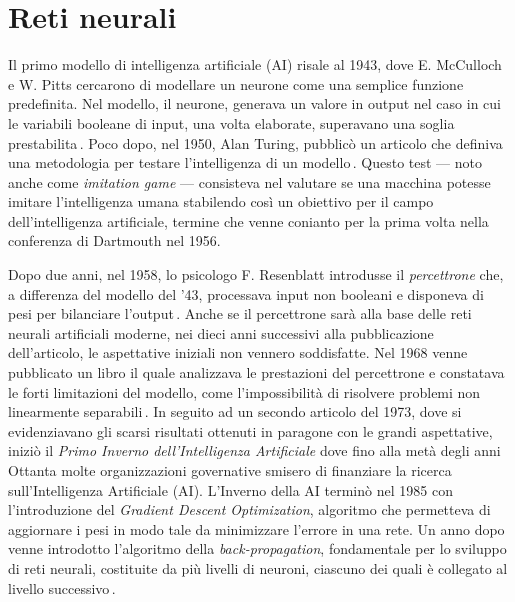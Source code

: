 
\chapter{Reti neurali}\label{chp:neural-networks}
% 
Il primo modello di intelligenza artificiale (\acs{AI}) risale al 1943, dove E. McCulloch e W. Pitts cercarono di modellare un neurone come una semplice funzione predefinita. Nel modello, il neurone, generava un valore in output nel caso in cui le variabili booleane di input, una volta elaborate, superavano una soglia prestabilita\,\cite[``A logical calculus of the ideas immanent in nervous activity'']{mcculloch1943logical}. Poco dopo, nel 1950, Alan Turing, pubblicò un articolo che definiva una metodologia per testare l'intelligenza di un modello\,\cite[``Computing machinery and intelligence'']{turing2009computing}. Questo test — noto anche come \textit{imitation game} — consisteva nel valutare se una macchina potesse imitare l'intelligenza umana stabilendo così un obiettivo per il campo dell'intelligenza artificiale, termine che venne conianto per la prima volta nella conferenza di Dartmouth nel 1956.

Dopo due anni, nel 1958, lo psicologo F. Resenblatt introdusse il \textsl{percettrone} che, a differenza del modello del '43, processava input non booleani e disponeva di pesi per bilanciare l'output\,\cite[``The perceptron: a probabilistic model for information storage and organization in the brain.'']{rosenblatt1958perceptron}. Anche se il percettrone sarà alla base delle reti neurali artificiali moderne, nei dieci anni successivi alla pubblicazione dell'articolo, le aspettative iniziali non vennero soddisfatte. Nel 1968 venne pubblicato un libro il quale analizzava le prestazioni del percettrone e constatava le forti limitazioni del modello, come l'impossibilità di risolvere problemi non linearmente separabili\,\cite[``Perceptrons'']{minsky2017perceptrons}. In seguito ad un secondo articolo del 1973, dove si evidenziavano gli scarsi risultati ottenuti in paragone con le grandi aspettative, iniziò il \textsl{Primo Inverno dell'Intelligenza Artificiale} dove fino alla metà degli anni Ottanta molte organizzazioni governative smisero di finanziare la ricerca sull'Intelligenza Artificiale (\acs{AI}). L'Inverno della \acs{AI} terminò nel 1985 con l'introduzione del \textit{Gradient Descent Optimization}, algoritmo che permetteva di aggiornare i pesi in modo tale da minimizzare l'errore in una rete. Un anno dopo venne introdotto l'algoritmo della \textit{back-propagation}, fondamentale per lo sviluppo di reti neurali, costituite da più livelli di neuroni, ciascuno dei quali è collegato al livello successivo\,\cite[``Learning representations by back-propagating errors'']{rumelhart1986learning}.

